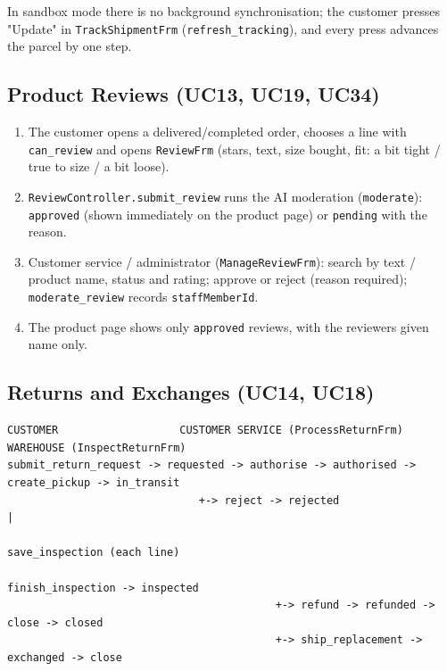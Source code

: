 In sandbox mode there is no background synchronisation; the customer
presses "Update" in \texttt{TrackShipmentFrm}
(\texttt{refresh\_\allowbreak{}tracking}), and every press advances the parcel by one
step.

\hypertarget{product-reviews-uc13-uc19-uc34}{%
\subsection{Product Reviews (UC13, UC19,
UC34)}\label{product-reviews-uc13-uc19-uc34}}

\begin{enumerate}
\def\labelenumi{\arabic{enumi}.}
\tightlist
\item
  The customer opens a delivered/completed order, chooses a line with
  \texttt{can\_\allowbreak{}review} and opens \texttt{ReviewFrm} (stars, text, size
  bought, fit: a bit tight / true to size / a bit loose).
\item
  \texttt{ReviewController.\allowbreak{}submit\_\allowbreak{}review} runs the AI moderation
  (\texttt{moderate}): \texttt{approved} (shown immediately on the
  product page) or \texttt{pending} with the reason.
\item
  Customer service / administrator (\texttt{ManageReviewFrm}): search by
  text / product name, status and rating; approve or reject (reason
  required); \texttt{moderate\_\allowbreak{}review} records \texttt{staffMemberId}.
\item
  The product page shows only \texttt{approved} reviews, with the
  reviewer\textquotesingle s given name only.
\end{enumerate}

\hypertarget{flow-returns}{%
\subsection{Returns and Exchanges (UC14, UC18)}\label{flow-returns}}

\begin{lstlisting}[numbers=none]
CUSTOMER                   CUSTOMER SERVICE (ProcessReturnFrm)        WAREHOUSE (InspectReturnFrm)
submit_return_request -> requested -> authorise -> authorised -> create_pickup -> in_transit
                              +-> reject -> rejected                           |
                                                          save_inspection (each line)
                                                          finish_inspection -> inspected
                                          +-> refund -> refunded -> close -> closed
                                          +-> ship_replacement -> exchanged -> close
\end{lstlisting}

